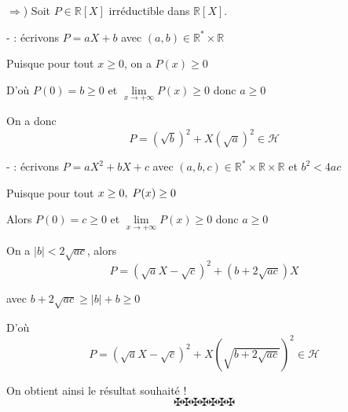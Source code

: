 $\Rightarrow$) Soit $P \in \mathbb{R}[X]$ irr{\'e}ductible dans
$\mathbb{R}[X]$.

-  : {\'e}crivons $P = aX + b$ avec $(a, b) \in
\mathbb{R}^{\ast} \times \mathbb{R}$

Puisque pour tout $x \geq 0$, on a $P (x) \geq 0$

D'o{\`u} $P (0) = b \geq 0$ et $\underset{x \to + \infty}{\lim} P (x) \geq 0$
donc $a \geq 0$

On a donc
\[ P = (\sqrt{b})^2 + X (\sqrt{a})^2 \in \mathcal{H} \]


- : {\'e}crivons $P = aX^2 + bX + c$ avec $(a, b,
c) \in \mathbb{R}^{\ast} \times \mathbb{R} \times \mathbb{R}$ et $b^2 < 4 ac$

Puisque pour tout $x \geq 0, \hspace{0.27em} P (x) \geq 0$

Alors $P (0) = c \geq 0$ et $\underset{x \to + \infty}{\lim} P (x) \geq 0$
donc $a \geq 0$

On a $| b | < 2 \sqrt{a c}$, alors
\[ P = (\sqrt{a} X - \sqrt{c})^2 + (b + 2 \sqrt{ac}) X \]


avec $b + 2 \sqrt{ac} \geq |b| + b \geqslant 0$

D'o{\`u}
\[ P = (\sqrt{a} X - \sqrt{c})^2 + X (\sqrt{b + 2 \sqrt{ac}})^2 \in
   \mathcal{H} \]


On obtient ainsi le r{\'e}sultat souhait{\'e} !
\[ \maltese \maltese \maltese \maltese \maltese \maltese \maltese \]



